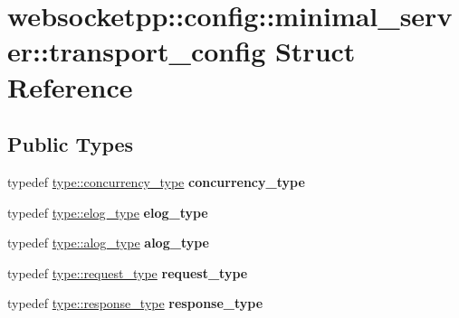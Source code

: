 \hypertarget{structwebsocketpp_1_1config_1_1minimal__server_1_1transport__config}{}\section{websocketpp\+:\+:config\+:\+:minimal\+\_\+server\+:\+:transport\+\_\+config Struct Reference}
\label{structwebsocketpp_1_1config_1_1minimal__server_1_1transport__config}
\subsection*{Public Types}
\begin{DoxyCompactItemize}
\item 
typedef \hyperlink{classwebsocketpp_1_1concurrency_1_1none}{type\+::concurrency\+\_\+type} {\bfseries concurrency\+\_\+type}\hypertarget{structwebsocketpp_1_1config_1_1minimal__server_1_1transport__config_a753cbfdd821f9a6643ba8ee70d4834e6}{}\label{structwebsocketpp_1_1config_1_1minimal__server_1_1transport__config_a753cbfdd821f9a6643ba8ee70d4834e6}

\item 
typedef \hyperlink{structwebsocketpp_1_1config_1_1minimal__server_ab8a516661fb2ddd3a3c377823b623c1a}{type\+::elog\+\_\+type} {\bfseries elog\+\_\+type}\hypertarget{structwebsocketpp_1_1config_1_1minimal__server_1_1transport__config_a678324060123483e9513cbcd24829cba}{}\label{structwebsocketpp_1_1config_1_1minimal__server_1_1transport__config_a678324060123483e9513cbcd24829cba}

\item 
typedef \hyperlink{classwebsocketpp_1_1log_1_1stub}{type\+::alog\+\_\+type} {\bfseries alog\+\_\+type}\hypertarget{structwebsocketpp_1_1config_1_1minimal__server_1_1transport__config_a09acf498effc5c29b26e50a98ce2b8e9}{}\label{structwebsocketpp_1_1config_1_1minimal__server_1_1transport__config_a09acf498effc5c29b26e50a98ce2b8e9}

\item 
typedef \hyperlink{classwebsocketpp_1_1http_1_1parser_1_1request}{type\+::request\+\_\+type} {\bfseries request\+\_\+type}\hypertarget{structwebsocketpp_1_1config_1_1minimal__server_1_1transport__config_ac45b02a9778ad3371ace822e80d43f8d}{}\label{structwebsocketpp_1_1config_1_1minimal__server_1_1transport__config_ac45b02a9778ad3371ace822e80d43f8d}

\item 
typedef \hyperlink{classwebsocketpp_1_1http_1_1parser_1_1response}{type\+::response\+\_\+type} {\bfseries response\+\_\+type}\hypertarget{structwebsocketpp_1_1config_1_1minimal__server_1_1transport__config_a5d29cd10696d9a67ad9baf580db6eddf}{}\label{structwebsocketpp_1_1config_1_1minimal__server_1_1transport__config_a5d29cd10696d9a67ad9baf580db6eddf}

\end{DoxyCompactItemize}
